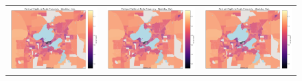\documentclass[letter]{article}
\begin{document}
\begin{figure}
\begin{center}
\begin{tabular}{ c c c }

  \includegraphics[width=60mm]{CarOwnershipVSfrequency1am.png}   & \includegraphics[width=60mm]{CarOwnershipVSfrequency2am.png}  & \includegraphics[width=60mm]{CarOwnershipVSfrequency3am.png}  \\
  

\end{tabular}
\end{center}
\end{figure}
\end{document}
